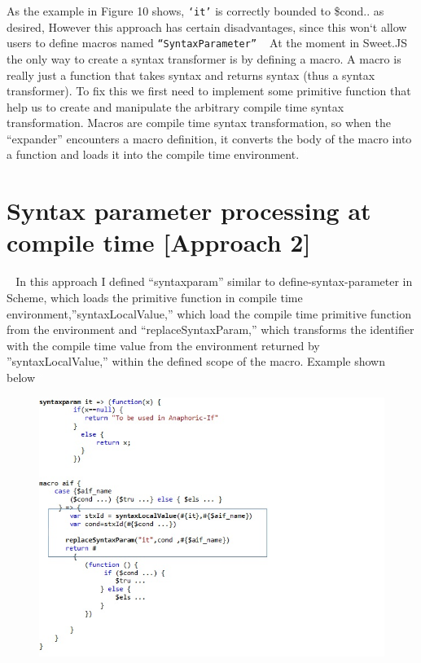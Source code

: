 As the example in Figure 10 shows, \texttt{`it'} is correctly bounded to \$cond.. as desired, However this approach has certain disadvantages, since this won`t allow users to define macros named \texttt{``SyntaxParameter''} 
\textcolor{white}{``}
At the moment in Sweet.JS the only way to create a syntax transformer is by defining a macro. A macro is really just a function that takes syntax and returns syntax (thus a syntax transformer). To fix this we first need to implement some primitive function that help us to create and manipulate the arbitrary compile time syntax transformation. Macros are compile time syntax transformation, so when the ``expander'' encounters a macro definition, it converts the body of the macro into a function and loads it into the compile time environment.
\textcolor{white}{''}
\newpage
\section{Syntax parameter processing at compile time [Approach 2]}
\textcolor{white}{``}
In this approach I defined ``syntaxparam'' similar to define-syntax-parameter in Scheme, which loads the primitive function in compile time environment,''syntaxLocalValue,'' which load the compile time primitive function from the environment and ``replaceSyntaxParam,'' which transforms the identifier with the compile time value from the environment returned by ''syntaxLocalValue,''  within the defined scope of the macro. Example shown below
\textcolor{white}{''}
\begin{figure}[htb]
\centering
\includegraphics[width=1.0\textwidth]{images/Appraoch21.jpg}

\label{fig:AST4}
\end{figure}
